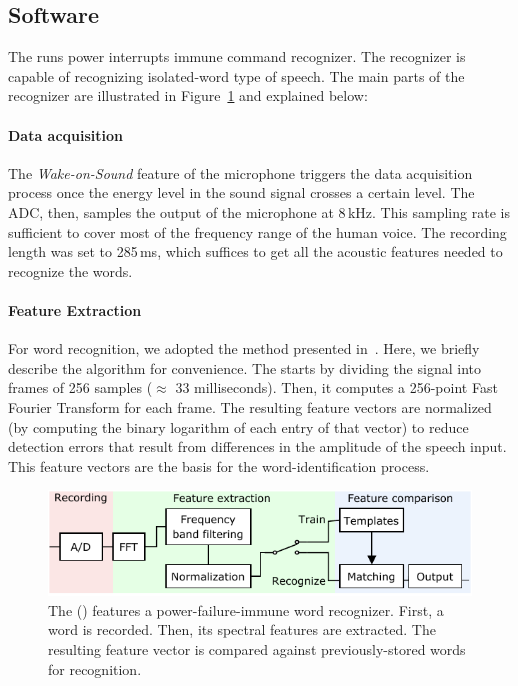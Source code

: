 \subsection{Software}
\label{sec:software}
The \cim runs power interrupts immune command recognizer. The recognizer is capable of recognizing isolated-word type of speech. 
The main parts of the recognizer are illustrated in Figure~\ref{fig:cis} and explained below:
%
\paragraph{Data acquisition}
The \textit{Wake-on-Sound} feature of the microphone triggers the data acquisition process once the energy level in the sound signal crosses a certain level. The ADC, then, samples the output of the microphone at 8\,kHz. This sampling rate is sufficient to cover most of the frequency range of the human voice. The recording length was set to 285\,ms, which suffices to get all the acoustic features needed to recognize the words.
%
\paragraph{Feature Extraction}
For word recognition, we adopted the method presented in~\cite{hopper1992fft}. Here, we briefly describe the algorithm for convenience. The \cim starts by dividing the signal into frames of 256 samples ($\approx$ 33 milliseconds). 
Then, it computes a 256-point Fast Fourier Transform for each frame. The resulting feature vectors are normalized (by computing the binary logarithm of each entry of that vector) to reduce detection errors that result from differences in the amplitude of the speech input. This feature vectors are the basis for the word-identification process. 
%
\begin{figure}
	\centering
	\includegraphics[width=\columnwidth]{figures/cis}
	\caption{The \fullCIM (\cim) features a power-failure-immune word recognizer. First, a word is recorded. Then, its spectral features are extracted. The resulting feature vector is compared against previously-stored words for recognition.}
	\label{fig:cis}
\end{figure}
%
